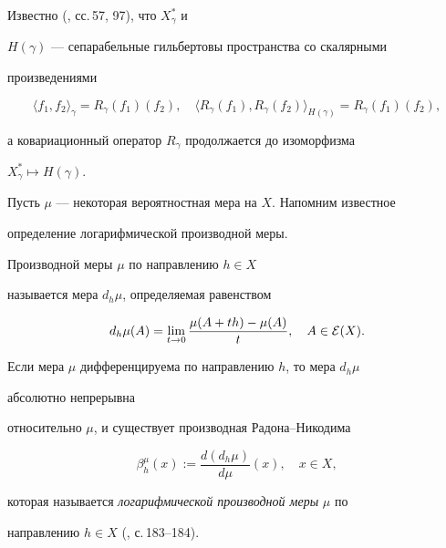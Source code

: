 Известно (\cite{Bogach}, сс.\,57, 97), что $X^*_\gamma$ и


$H(\gamma)$ --- сепарабельные гильбертовы пространства со скалярными 


произведениями


$$


\langle f_1,f_2\rangle_{\gamma}=


R_\gamma(f_1)(f_2),\quad


\langle R_\gamma(f_1),R_\gamma(f_2)\rangle_{H(\gamma)}=R_\gamma(f_1)(f_2),


$$


а ковариационный оператор $R_\gamma$ продолжается до изоморфизма


$X_\gamma^*\mapsto H(\gamma)$.





Пусть $\mu$ --- некоторая вероятностная мера на $X$. Напомним известное 


определение логарифмической производной меры.








\begin{defn}


Производной меры $\mu$ по направлению $h\in X$


называется мера $d_h\mu$, определяемая равенством


$$


d_h\mu(A)=\lim_{t\to0}\frac{\mu(A+th)-\mu(A)}t,\quad A\in{\cal E}(X).


$$





Если мера $\mu$ дифференцируема по направлению $h$, то мера $d_h\mu$ 


абсолютно непрерывна


относительно $\mu$, и существует производная Радона--Никодима


$$


\beta_h^\mu(x):=\frac{d(d_h\mu)}{d\mu}(x),\quad x\in X,


$$


которая называется {\it логарифмической производной меры} $\mu$ по


направлению $h\in X$ (\cite{Bogach}, с.\,183--184).


\end{defn}








